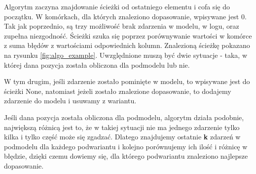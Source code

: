 Algorytm zaczyna znajdowanie ścieżki od ostatniego elementu i cofa się do początku. W komórkach, dla których znaleziono dopasowanie, wpisywane jest 0. Tak jak poprzednio, są trzy możliwość brak zdarzenia w modelu, w logu, oraz zupełna niezgodność. Ścieżki szuka się poprzez porównywanie wartości w komórce z suma błędów z wartościami odpowiednich kolumn. Znalezioną ścieżkę pokazano na rysunku \ref{fig:algo_example}. Uwzględnione muszą być dwie sytuacje - taka, w której dana pozycja została obliczona dla podmodelu lub nie.

W tym drugim, jeśli zdarzenie zostało pominięte w modelu, to wpisywane jest do ścieżki None, natomiast jeżeli zostało znalezione dopasowanie, to dodajemy zdarzenie do modelu i usuwamy z wariantu.

Jeśli dana pozycja została obliczona dla podmodelu, algorytm działa podobnie, największą różnicą jest to, że w takiej sytuacji nie ma jednego zdarzenie tylko kilka i tylko część może się zgadzać. Dlatego znajdujemy ostatnie \textbf{k} zdarzeń w podmodelu dla każdego podwariantu i kolejno porównujemy ich ilość i różnicę w błędzie, dzięki czemu dowiemy się, dla którego podwariantu znaleziono najlepsze dopasowanie. 

